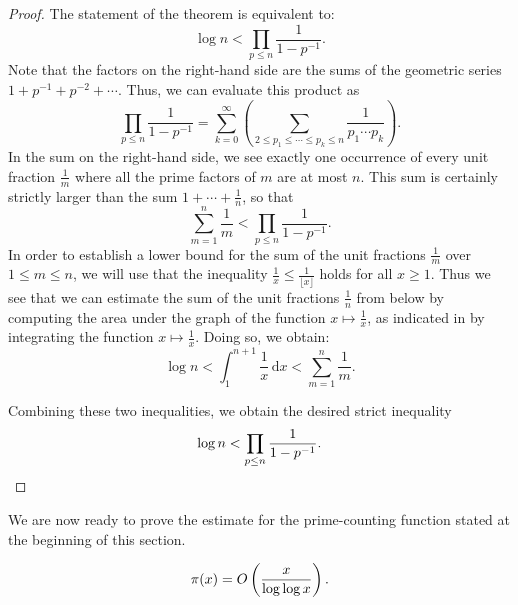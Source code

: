 \begin{proof}
  The statement of the theorem is equivalent to:
  \begin{equation*}
    \log n<\prod_{p\leq n}\frac{1}{1-p^{-1}}.
  \end{equation*}
  Note that the factors on the right-hand side are the sums of the geometric series $1+p^{-1}+p^{-2}+\cdots$. Thus, we can evaluate this product as
  \begin{equation*}
    \prod_{p\leq n}\frac{1}{1-p^{-1}} = \sum_{k=0}^{\infty}\left(\sum_{2\leq p_1\leq \cdots \leq p_k\leq n} \frac{1}{p_1\cdots p_k}\right).
  \end{equation*}
  In the sum on the right-hand side, we see exactly one occurrence of every unit fraction $\frac{1}{m}$ where all the prime factors of $m$ are at most $n$. This sum is certainly strictly larger than the sum $1+\cdots +\frac{1}{n}$, so that
  \begin{equation*}
    \sum_{m=1}^{n} \frac{1}{m}<\prod_{p\leq n}\frac{1}{1-p^{-1}}.
  \end{equation*}
  In order to establish a lower bound for the sum of the unit fractions $\frac{1}{m}$ over $1\leq m\leq n$, we will use that the inequality $\frac{1}{x}\leq \frac{1}{\lfloor x\rfloor}$ holds for all $x\geq 1$. Thus we see that we can estimate the sum of the unit fractions $\frac{1}{n}$ from below by computing the area under the graph of the function $x\mapsto \frac{1}{x}$, as indicated in  by integrating the function $x\mapsto \frac{1}{x}$. Doing so, we obtain:
  \begin{equation*}
    \log n<\int_1^{n+1}\frac{1}{x}\,\mathrm{d}x<\sum_{m=1}^n\frac{1}{m}.
  \end{equation*}

  Combining these two inequalities, we obtain the desired strict inequality
  \begin{equation*}
    \log n < \prod_{p\leq n}\frac{1}{1-p^{-1}}. \qedhere
  \end{equation*}
\end{proof}

We are now ready to prove the estimate for the prime-counting function stated at the beginning of this section.

\begin{theorem}
  \begin{equation*}
    \pi(x)=O\left(\frac{x}{\log\log x}\right).
  \end{equation*}
\end{theorem}


